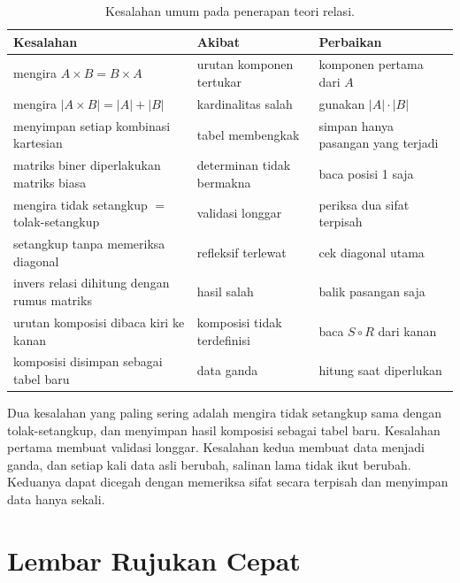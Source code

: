 \documentclass[11pt,a4paper]{article}
\begin{document}
\begin{table}[H]
	\centering
	\caption{Kesalahan umum pada penerapan teori relasi.}
	\label{tab:kesalahan}
	\footnotesize
	\begin{tabularx}{\textwidth}{l X X}
		\toprule
		Kesalahan                                   & Akibat                      & Perbaikan                          \\
		\midrule
		mengira $A \times B=B \times A$             & urutan komponen tertukar    & komponen pertama dari $A$          \\
		mengira $|A \times B|=|A|+|B|$              & kardinalitas salah          & gunakan $|A| \cdot |B|$            \\
		menyimpan setiap kombinasi kartesian        & tabel membengkak            & simpan hanya pasangan yang terjadi \\
		matriks biner diperlakukan matriks biasa    & determinan tidak bermakna   & baca posisi 1 saja                 \\
		mengira tidak setangkup $=$ tolak-setangkup & validasi longgar            & periksa dua sifat terpisah         \\
		setangkup tanpa memeriksa diagonal          & refleksif terlewat          & cek diagonal utama                 \\
		invers relasi dihitung dengan rumus matriks & hasil salah                 & balik pasangan saja                \\
		urutan komposisi dibaca kiri ke kanan       & komposisi tidak terdefinisi & baca $S \circ R$ dari kanan        \\
		komposisi disimpan sebagai tabel baru       & data ganda                  & hitung saat diperlukan             \\
		\bottomrule
	\end{tabularx}
\end{table}

Dua kesalahan yang paling sering adalah mengira tidak setangkup sama dengan tolak-setangkup, dan menyimpan hasil komposisi sebagai tabel baru. Kesalahan pertama membuat validasi longgar. Kesalahan kedua membuat data menjadi ganda, dan setiap kali data asli berubah, salinan lama tidak ikut berubah. Keduanya dapat dicegah dengan memeriksa sifat secara terpisah dan menyimpan data hanya sekali.

\section{Lembar Rujukan Cepat}
\end{document}
